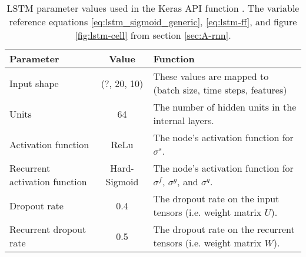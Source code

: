 \begin{table}[!htb]
    \centering
    \caption{\ac{LSTM} parameter values used in the Keras API function \cite{chollet2015keras}. The variable reference equations \ref{eq:lstm_sigmoid_generic}, \ref{eq:lstm-ff}, and figure \ref{fig:lstm-cell} from section \ref{sec:A-rnn}.}
    \begin{tabular}{>{\raggedright}p{} | c | p{}}
        \textbf{Parameter}              & \textbf{Value}    & \textbf{Function} \\ \hline
        Input shape                     & (?, 20, 10)       & These values are mapped to (batch size, time steps, features) \\ \hline
        Units                           & 64                & The number of hidden units in the internal layers. \\ \hline
        Activation function             & ReLu              & The node's activation function for $\sigma^s$.\\ \hline
        Recurrent activation function   & Hard-Sigmoid      & The node's activation function for $\sigma^f$, $\sigma^g$, and $\sigma^q$.\\ \hline
        Dropout rate                    & 0.4               & The dropout rate on the input tensors (i.e. weight matrix $U$). \\ \hline
        Recurrent dropout rate          & 0.5               & The dropout rate on the recurrent tensors (i.e. weight matrix $W$). \\ \hline
    \end{tabular}
    \label{tab:lstm-parameters}
\end{table}